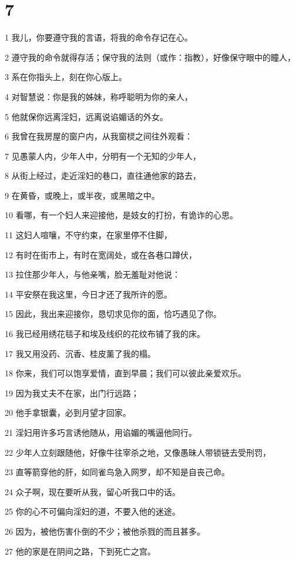 \chapter{7}

\par 1 我儿，你要遵守我的言语，将我的命令存记在心。
\par 2 遵守我的命令就得存活；保守我的法则（或作：指教），好像保守眼中的瞳人，
\par 3 系在你指头上，刻在你心版上。
\par 4 对智慧说：你是我的姊妹，称呼聪明为你的亲人，
\par 5 他就保你远离淫妇，远离说谄媚话的外女。
\par 6 我曾在我房屋的窗户内，从我窗棂之间往外观看：
\par 7 见愚蒙人内，少年人中，分明有一个无知的少年人，
\par 8 从街上经过，走近淫妇的巷口，直往通他家的路去，
\par 9 在黄昏，或晚上，或半夜，或黑暗之中。
\par 10 看哪，有一个妇人来迎接他，是妓女的打扮，有诡诈的心思。
\par 11 这妇人喧嚷，不守约束，在家里停不住脚，
\par 12 有时在街市上，有时在宽阔处，或在各巷口蹲伏，
\par 13 拉住那少年人，与他亲嘴，脸无羞耻对他说：
\par 14 平安祭在我这里，今日才还了我所许的愿。
\par 15 因此，我出来迎接你，恳切求见你的面，恰巧遇见了你。
\par 16 我已经用绣花毯子和埃及线织的花纹布铺了我的床。
\par 17 我又用没药、沉香、桂皮薰了我的榻。
\par 18 你来，我们可以饱享爱情，直到早晨；我们可以彼此亲爱欢乐。
\par 19 因为我丈夫不在家，出门行远路；
\par 20 他手拿银囊，必到月望才回家。
\par 21 淫妇用许多巧言诱他随从，用谄媚的嘴逼他同行。
\par 22 少年人立刻跟随他，好像牛往宰杀之地，又像愚昧人带锁链去受刑罚，
\par 23 直等箭穿他的肝，如同雀鸟急入网罗，却不知是自丧己命。
\par 24 众子啊，现在要听从我，留心听我口中的话。
\par 25 你的心不可偏向淫妇的道，不要入他的迷途。
\par 26 因为，被他伤害仆倒的不少；被他杀戮的而且甚多。
\par 27 他的家是在阴间之路，下到死亡之宫。

